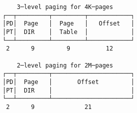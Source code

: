 \documentclass[varwidth]{standalone}
\begin{document}
\begin{verbatim}
    3─level paging for 4K─pages
┌──┬─────────┬─────────┬────────────┐
│PD│  Page   │  Page   │   Offset   │
│PT│  DIR    │  Table  │            │
└──┴─────────┴─────────┴────────────┘
 2      9         9          12

    2─level paging for 2M─pages
┌──┬─────────┬──────────────────────┐
│PD│  Page   │       Offset         │
│PT│  DIR    │                      │
└──┴─────────┴──────────────────────┘
 2      9              21
\end{verbatim}
\end{document}
